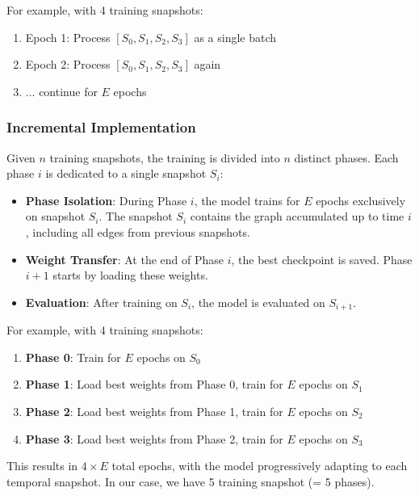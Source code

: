 For example, with 4 training snapshots:
\begin{enumerate}
	\item Epoch 1: Process $[S_0, S_1, S_2, S_3]$ as a single batch
	\item Epoch 2: Process $[S_0, S_1, S_2, S_3]$ again
	\item ... continue for $E$ epochs
\end{enumerate}


\subsubsection*{Incremental Implementation}
\label{sec:incremental}

Given $n$ training snapshots, the training is divided into $n$ distinct phases. Each phase $i$ is dedicated to a single snapshot $S_i$:

\begin{itemize}
	\item \textbf{Phase Isolation}: During Phase $i$, the model trains for $E$ epochs exclusively on snapshot $S_i$. The snapshot $S_i$ contains the graph accumulated up to time $i$, including all edges from previous snapshots.
	\item \textbf{Weight Transfer}: At the end of Phase $i$, the best checkpoint is saved. Phase $i+1$ starts by loading these weights.
	\item \textbf{Evaluation}: After training on $S_i$, the model is evaluated on $S_{i+1}$.
\end{itemize}

For example, with 4 training snapshots:
\begin{enumerate}
	\item \textbf{Phase 0}: Train for $E$ epochs on $S_0$
	\item \textbf{Phase 1}: Load best weights from Phase 0, train for $E$ epochs on $S_1$
	\item \textbf{Phase 2}: Load best weights from Phase 1, train for $E$ epochs on $S_2$
	\item \textbf{Phase 3}: Load best weights from Phase 2, train for $E$ epochs on $S_3$
\end{enumerate}

This results in $4 \times E$ total epochs, with the model progressively adapting to each temporal snapshot. In our case, we have 5 training snapshot (= 5 phases).

